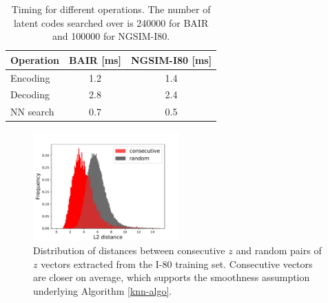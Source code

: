 \documentclass{article}
\begin{document}
\begin{table}
  \caption{Timing for different operations. The number of latent codes searched over is 240000 for BAIR and 100000 for NGSIM-I80. }
  \label{nn-search-timing}
  \centering
  \begin{tabular}{lcc}
    \toprule
    Operation     & BAIR [ms] & NGSIM-I80 [ms] \\
    \midrule
    Encoding  & 1.2 & 1.4 \\
    Decoding  & 2.8 & 2.4 \\
    NN search & 0.7 & 0.5 \\
    \bottomrule
  \end{tabular}
\end{table}

\begin{figure}
  \centering
  \includegraphics[width=0.5\textwidth]{images/distance_histograms.pdf}
  \caption{Distribution of distances between consecutive $z$ and random pairs of $z$ vectors extracted from the I-80 training set. Consecutive vectors are closer on average, which supports the smoothness assumption underlying Algorithm \ref{knn-algo}.}
\end{figure}



%
\end{document}
